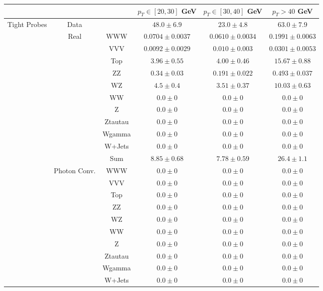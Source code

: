 \small
\begin{tabular}{|c|cc||c|c|c|}
\hline
\multicolumn{3}{|c||}{} & $p_{T}\in[20,30]$ GeV & $p_{T}\in[30,40]$ GeV & $p_{T} > 40$ GeV\\ 
\hline
\hline
\multirow{23}{*}{Tight Probes} & Data & &  $48.0 \pm 6.9$ &  $23.0 \pm 4.8$ &  $63.0 \pm 7.9$\\ 
\cline{2-6}

&\multirow{11}{*}{Real} &WWW &  $0.0704 \pm 0.0037$ &  $0.0610 \pm 0.0034$ &  $0.1991 \pm 0.0063$\\ 
&& VVV &  $0.0092 \pm 0.0029$ &  $0.010 \pm 0.003$ &  $0.0301 \pm 0.0053$\\ 
&& Top &  $3.96 \pm 0.55$ &  $4.00 \pm 0.46$ &  $15.67 \pm 0.88$\\ 
&& ZZ &  $0.34 \pm 0.03$ &  $0.191 \pm 0.022$ &  $0.493 \pm 0.037$\\ 
&& WZ &  $4.5 \pm 0.4$ &  $3.51 \pm 0.37$ &  $10.03 \pm 0.63$\\ 
&& WW &  $0.0 \pm 0$ &  $0.0 \pm 0$ &  $0.0 \pm 0$\\ 
&& Z &  $0.0 \pm 0$ &  $0.0 \pm 0$ &  $0.0 \pm 0$\\ 
&& Ztautau &  $0.0 \pm 0$ &  $0.0 \pm 0$ &  $0.0 \pm 0$\\ 
&& Wgamma &  $0.0 \pm 0$ &  $0.0 \pm 0$ &  $0.0 \pm 0$\\ 
&& W+Jets &  $0.0 \pm 0$ &  $0.0 \pm 0$ &  $0.0 \pm 0$\\ 
\cline{3-6}
&& Sum &  $8.85 \pm 0.68$ &  $7.78 \pm 0.59$ &  $26.4 \pm 1.1$\\ 
\cline{2-6}
\cline{2-6}
&\multirow{11}{*}{Photon Conv.} &WWW &  $0.0 \pm 0$ &  $0.0 \pm 0$ &  $0.0 \pm 0$\\ 
&& VVV &  $0.0 \pm 0$ &  $0.0 \pm 0$ &  $0.0 \pm 0$\\ 
&& Top &  $0.0 \pm 0$ &  $0.0 \pm 0$ &  $0.0 \pm 0$\\ 
&& ZZ &  $0.0 \pm 0$ &  $0.0 \pm 0$ &  $0.0 \pm 0$\\ 
&& WZ &  $0.0 \pm 0$ &  $0.0 \pm 0$ &  $0.0 \pm 0$\\ 
&& WW &  $0.0 \pm 0$ &  $0.0 \pm 0$ &  $0.0 \pm 0$\\ 
&& Z &  $0.0 \pm 0$ &  $0.0 \pm 0$ &  $0.0 \pm 0$\\ 
&& Ztautau &  $0.0 \pm 0$ &  $0.0 \pm 0$ &  $0.0 \pm 0$\\ 
&& Wgamma &  $0.0 \pm 0$ &  $0.0 \pm 0$ &  $0.0 \pm 0$\\ 
&& W+Jets &  $0.0 \pm 0$ &  $0.0 \pm 0$ &  $0.0 \pm 0$\\ 

\end{tabular}
